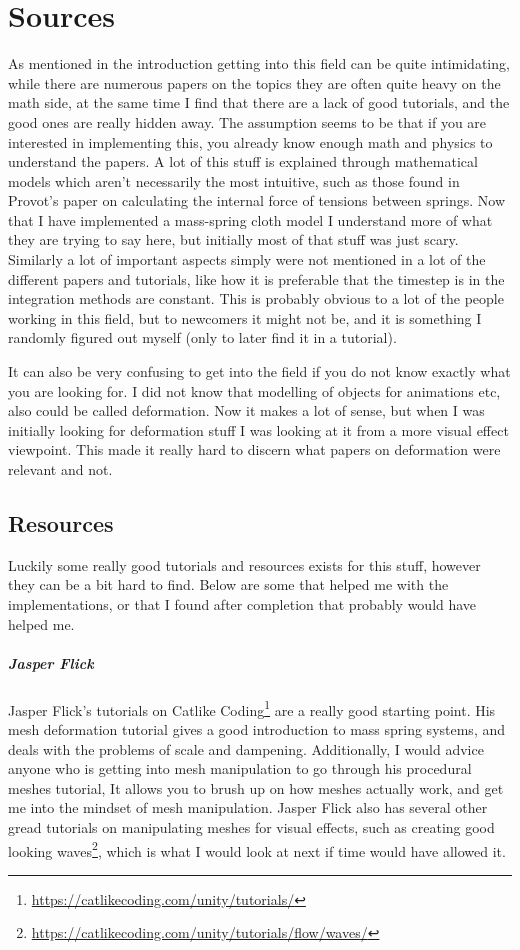 \chapter{Sources}
As mentioned in the introduction getting into this field can be quite intimidating,
while there are numerous papers on the topics they are often quite heavy on the math side,
at the same time I find that there are a lack of good tutorials, and the good ones are really hidden away.
The assumption seems to be that if you are interested in implementing this, 
you already know enough math and physics to understand the papers.
A lot of this stuff is explained through mathematical models which aren't necessarily the most intuitive,
such as those found in Provot's paper\cite{provot_mass_spring} on calculating the internal force of tensions between springs.
Now that I have implemented a mass-spring cloth model I understand more of what they are trying to say here,
but initially most of that stuff was just scary.
Similarly a lot of important aspects simply were not mentioned in a lot of the different papers and tutorials,
like how it is preferable that the timestep is in the integration methods are constant.
This is probably obvious to a lot of the people working in this field, but to newcomers it might not be,
and it is something I randomly figured out myself (only to later find it in a tutorial).

It can also be very confusing to get into the field if you do not know exactly what you are looking for. 
I did not know that modelling of objects for animations etc, also could be called deformation.
Now it makes a lot of sense, but when I was initially looking for deformation stuff I was looking at it from a more visual effect
viewpoint. This made it really hard to discern what papers on deformation were relevant and not.

\section{Resources}
Luckily some really good tutorials and resources exists for this stuff, however they can be a bit hard to find.
Below are some that helped me with the implementations, or that I found after completion that probably would have helped me.

\paragraph{Jasper Flick}
Jasper Flick's tutorials on Catlike Coding\footnote{\url{https://catlikecoding.com/unity/tutorials/}}
are a really good starting point. His mesh deformation tutorial gives a good introduction to mass spring systems, and deals with the problems of scale and dampening.
Additionally, I would advice anyone who is getting into mesh manipulation to go through his procedural meshes tutorial,
It allows you to brush up on how meshes actually work, and get me into the mindset of mesh manipulation.
Jasper Flick also has several other gread tutorials on manipulating meshes for visual effects, such as creating good looking waves\footnote{\url{https://catlikecoding.com/unity/tutorials/flow/waves/}}, which is what I would look at next if time would have allowed it.

